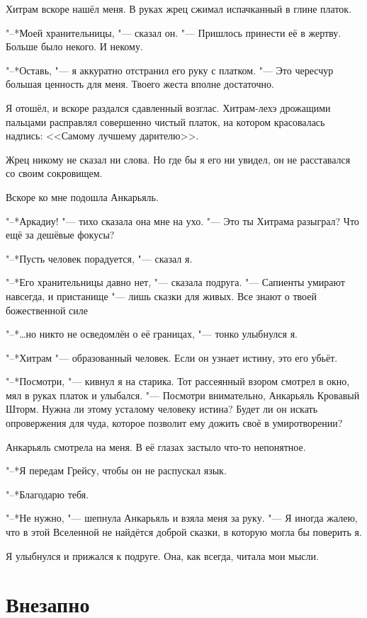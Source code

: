 \documentclass[a4paper,10pt,fleqn]{book}
\newcommand{\ldotst}{\so{...}\xspace}
\begin{document}
Хитрам вскоре нашёл меня.
В руках жрец сжимал испачканный в глине платок.

"--*Моей хранительницы, "--- сказал он.
"--- Пришлось принести её в жертву.
Больше было некого.
И некому.

"--*Оставь, "--- я аккуратно отстранил его руку с платком.
"--- Это чересчур большая ценность для меня.
Твоего жеста вполне достаточно.

Я отошёл, и вскоре раздался сдавленный возглас.
Хитрам-лехэ дрожащими пальцами расправлял совершенно чистый платок, на котором красовалась надпись: <<Самому лучшему дарителю>>.

Жрец никому не сказал ни слова.
Но где бы я его ни увидел, он не расставался со своим сокровищем.

Вскоре ко мне подошла Анкарьяль.

"--*Аркадиу! "--- тихо сказала она мне на ухо.
"--- Это ты Хитрама разыграл?
Что ещё за дешёвые фокусы?

"--*Пусть человек порадуется, "--- сказал я.

"--*Его хранительницы давно нет, "--- сказала подруга.
"--- Сапиенты умирают навсегда, и пристанище "--- лишь сказки для живых.
Все знают о твоей божественной силе\ldotst

"--*\ldots но никто не осведомлён о её границах, "--- тонко улыбнулся я.

"--*Хитрам "--- образованный человек.
Если он узнает истину, это его убьёт.

"--*Посмотри, "--- кивнул я на старика.
Тот рассеянный взором смотрел в окно, мял в руках платок и улыбался.
"--- Посмотри внимательно, Анкарьяль Кровавый Шторм.
Нужна ли этому усталому человеку истина?
Будет ли он искать опровержения для чуда, которое позволит ему дожить своё в умиротворении?

Анкарьяль смотрела на меня.
В её глазах застыло что-то непонятное.

"--*Я передам Грейсу, чтобы он не распускал язык.

"--*Благодарю тебя.

"--*Не нужно, "--- шепнула Анкарьяль и взяла меня за руку.
"--- Я иногда жалею, что в этой Вселенной не найдётся доброй сказки, в которую могла бы поверить я.

Я улыбнулся и прижался к подруге.
Она, как всегда, читала мои мысли.

\section{Внезапно}
\end{document}
